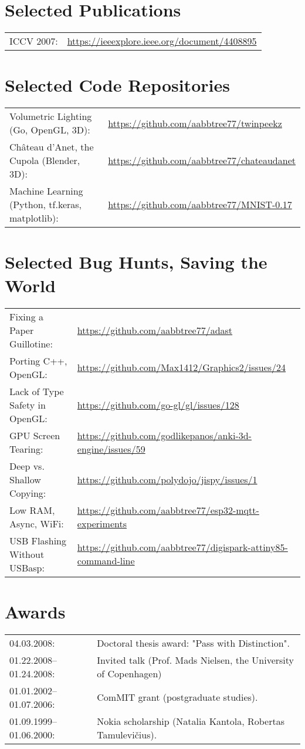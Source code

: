 \documentclass[a4paper,11pt]{article}
\begin{document}
\section*{Selected Publications}
\label{sect:pubs}

\begin{tabular}{ll}
ICCV 2007:& \url{https://ieeexplore.ieee.org/document/4408895}
\end{tabular}


%
\section*{Selected Code Repositories}
\begin{tabular}{ll}
Volumetric Lighting (Go, OpenGL, 3D): & \url{https://github.com/aabbtree77/twinpeekz}\\
Château d'Anet, the Cupola (Blender, 3D): & \url{https://github.com/aabbtree77/chateaudanet}\\
Machine Learning (Python, tf.keras, matplotlib): & \url{https://github.com/aabbtree77/MNIST-0.17}
\end{tabular}

%
\section*{Selected Bug Hunts, Saving the World}
\begin{tabular}{ll}
Fixing a Paper Guillotine: & \url{https://github.com/aabbtree77/adast}\\
Porting C++, OpenGL: & \url{https://github.com/Max1412/Graphics2/issues/24}\\
Lack of Type Safety in OpenGL: & \url{https://github.com/go-gl/gl/issues/128}\\
GPU Screen Tearing: & \url{https://github.com/godlikepanos/anki-3d-engine/issues/59}\\
Deep vs. Shallow Copying: & \url{https://github.com/polydojo/jispy/issues/1}\\
Low RAM, Async, WiFi: & \url{https://github.com/aabbtree77/esp32-mqtt-experiments}\\
USB Flashing Without USBasp: & \url{https://github.com/aabbtree77/digispark-attiny85-command-line}\\
\end{tabular}

%
%
\section*{Awards}
%
\begin{tabular}{ll}
        04.03.2008: & Doctoral thesis award: "Pass with Distinction".\\
        01.22.2008--01.24.2008: & Invited talk (Prof. Mads Nielsen, the University of Copenhagen)\\
        01.01.2002--01.07.2006:& ComMIT grant (postgraduate studies).\\
        01.09.1999--01.06.2000:& Nokia scholarship (Natalia Kantola, Robertas Tamulevi\v{c}ius).
\end{tabular}
%
%

\end{document}
